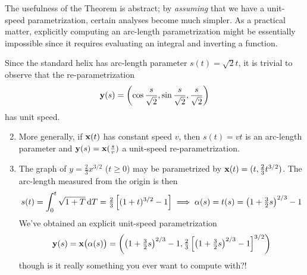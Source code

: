 The usefulness of the Theorem is abstract; by \emph{assuming} that we have a unit-speed parametrization, certain analyses become much simpler. As a practical matter, explicitly computing an arc-length parametrization might be essentially impossible since it requires evaluating an integral and inverting a function. 

\begin{examples}{}{}
\exstart Since the standard helix has arc-length parameter $s(t)=\sqrt 2t$, it is trivial to observe that the re-parametrization
\[{\mathbf{y}}(s)=\left(\cos\frac s{\sqrt 2},\sin\frac s{\sqrt 2},\frac s{\sqrt 2}\right) \]
has unit speed.
\begin{enumerate}\setcounter{enumi}{1}
  \item More generally, if ${\mathbf{x}}(t)$ has constant speed $v$, then $s(t)=vt$ is an arc-length parameter and ${\mathbf{y}}(s)={\mathbf{x}}(\tfrac sv)$ a unit-speed re-parametrization.
  \item The graph of $y=\frac 23x^{3/2}$ ($t\ge 0$) may be parametrized by ${\mathbf{x}}(t)=(t,\frac 23t^{3/2})$. The arc-length measured from the origin is then
  \[s(t)=\int_0^t\sqrt{1+T}\,\mathrm{d} T =\tfrac 23\left[(1+t)^{3/2}-1\right] \implies \alpha(s)=t(s)=\left(1+\tfrac 32s\right)^{2/3}-1\]
  We've obtained an explicit unit-speed parametrization
  \[{\mathbf{y}}(s)={\mathbf{x}}\bigl(\alpha(s)\bigr) =\left(\left(1+\tfrac 32s\right)^{2/3}-1,\tfrac 23\left[\left(1+\tfrac 32s\right)^{2/3}-1\right]^{3/2}\right) \]
  though is it really something you ever want to compute with?!

	\goodbreak
	

\end{enumerate}
\end{examples}
